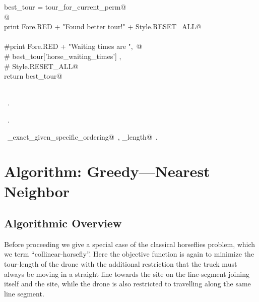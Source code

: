 \documentclass[11.5pt]{report}
\begin{document}
\begin{flushleft}
\begin{minipage}{\linewidth}
\begin{list}{}{}
\mbox{}\verb@                best_tour = tour_for_current_perm@\\
\mbox{}\verb@                @\\
\mbox{}\verb@                print Fore.RED + "Found better tour!" + Style.RESET_ALL@\\
\mbox{}\verb@@\\
\mbox{}\verb@    #print Fore.RED + "\nHorse Waiting times are ",\ @\\
\mbox{}\verb@    #       best_tour['horse_waiting_times'] , \@\\
\mbox{}\verb@    #       Style.RESET_ALL@\\
\mbox{}\verb@    return best_tour@\\
\mbox{}\verb@@\\
\mbox{}\verb@@{\NWsep}
\end{list}
\vspace{-1.5ex}
\footnotesize
\begin{list}{}{\setlength{\itemsep}{-\parsep}\setlength{\itemindent}{-\leftmargin}}
\item \NWtxtMacroDefBy\ .
\item \NWtxtMacroRefIn\ .
\item \NWtxtIdentsUsed\nobreak\  \verb@algo_exact_given_specific_ordering@\nobreak\ , \verb@tour_length@\nobreak\ .
\item{}
\end{list}
\end{minipage}\vspace{4ex}
\end{flushleft}
\section{Algorithm: Greedy---Nearest Neighbor}  
\label{sec:greedy-nn}
\subsection{Algorithmic Overview}
\newchunk Before proceeding we give a special case of the 
          classical horseflies problem, which we term 
         ``collinear-horsefly''. Here the objective function
         is again to minimize the tour-length of the drone
         with the additional restriction that the truck must
     always be moving in a straight line towards the site on the 
line-segment joining itself and the site, while the drone is also 
restricted to travelling along the same line segment. 
\end{document}
